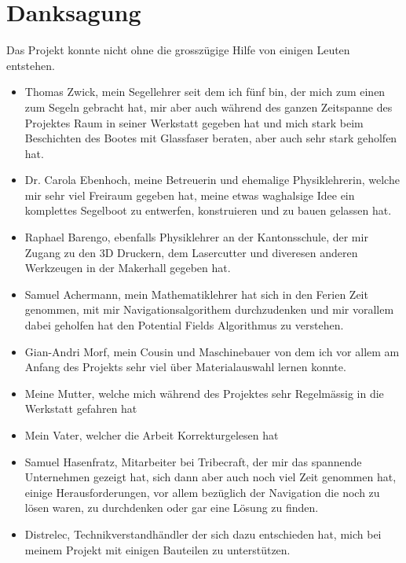 

\chapter{Danksagung}
\label{chap:danksagung}
Das Projekt konnte nicht ohne die grosszügige Hilfe von einigen Leuten entstehen.
\begin{itemize}
\item Thomas Zwick, mein Segellehrer seit dem ich fünf bin, der mich zum einen zum Segeln gebracht hat, mir aber auch während des ganzen Zeitspanne des Projektes Raum in seiner Werkstatt gegeben hat und mich stark beim Beschichten des Bootes mit Glassfaser beraten, aber auch sehr stark geholfen hat.
 \item Dr. Carola Ebenhoch, meine Betreuerin und ehemalige Physiklehrerin, welche mir sehr viel Freiraum gegeben hat, meine etwas waghalsige Idee ein komplettes Segelboot zu entwerfen, konstruieren und zu bauen gelassen hat.
  \item Raphael Barengo, ebenfalls Physiklehrer an der Kantonsschule, der mir Zugang zu den 3D Druckern, dem Lasercutter und diveresen anderen Werkzeugen in der Makerhall gegeben hat.  
  \item Samuel Achermann, mein Mathematiklehrer hat sich in den Ferien Zeit genommen, mit mir Navigationsalgorithem durchzudenken und mir vorallem dabei geholfen hat den Potential Fields Algorithmus zu verstehen.
  
  \item Gian-Andri Morf, mein Cousin und Maschinebauer von dem ich vor allem am Anfang des Projekts sehr viel über Materialauswahl lernen konnte.
  \item Meine Mutter, welche mich während des Projektes sehr Regelmässig in die Werkstatt gefahren hat
  \item  Mein Vater, welcher die Arbeit Korrekturgelesen hat
   \item Samuel Hasenfratz, Mitarbeiter bei Tribecraft, der mir das spannende Unternehmen gezeigt hat, sich dann aber auch noch viel Zeit genommen hat, einige Herausforderungen, vor allem bezüglich der Navigation die noch zu lösen waren, zu durchdenken oder gar eine Lösung zu finden. 
\item Distrelec, Technikverstandhändler der sich dazu entschieden hat, mich bei meinem Projekt mit einigen Bauteilen zu unterstützen. 
 
\end{itemize}
